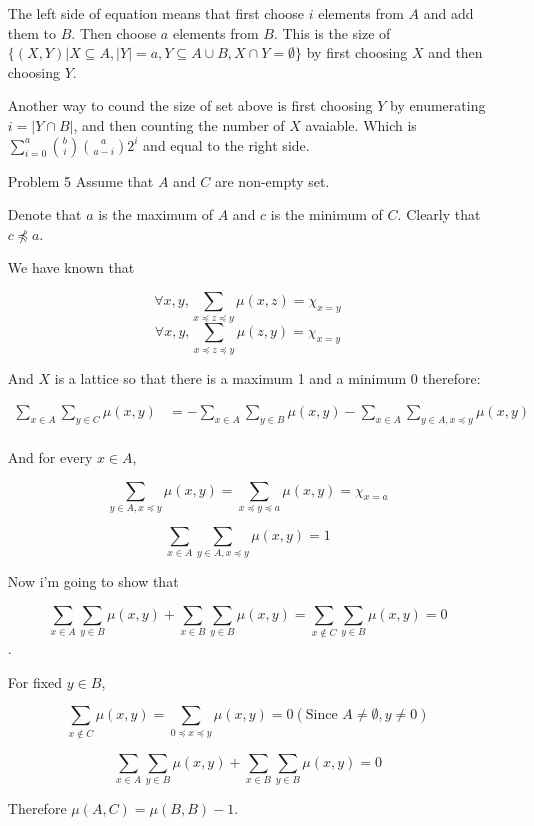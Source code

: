 \documentclass{article}
\begin{document}
\begin{itemize}
        The left side of equation means that first choose $i$ elements from $A$
        and add them to $B$. Then choose $a$ elements from $B$. This is the size
        of $\{(X, Y) | X \subseteq A, |Y| = a, Y \subseteq A \cup B, X \cap Y = \emptyset\}$
        by first choosing $X$ and then choosing $Y$.

        Another way to cound the size of set above is first choosing $Y$ by
        enumerating $i = |Y \cap B|$, and then counting the number of $X$ avaiable.
        Which is $\sum_{i=0}^{a}{b \choose i} {a \choose a-i} 2^i$ and equal to the right side.

    \item[Problem 5]
        Assume that $A$ and $C$ are non-empty set.

        Denote that $a$ is the maximum of $A$ and $c$ is the minimum
        of $C$. Clearly that $c \npreceq a$.

        We have known that 

        $$\forall x, y, \sum_{x \preceq z \preceq y} \mu(x, z) = \chi_{x=y}$$
        $$\forall x, y, \sum_{x \preceq z \preceq y} \mu(z, y) = \chi_{x=y}$$

        And $X$ is a lattice so that there is a maximum 1 and a minimum 0 therefore:

        \begin{align*}
            \sum_{x \in A} \sum_{y \in C} \mu(x, y) &= -\sum_{x \in A} \sum_{y \in B} \mu(x, y) - \sum_{x \in A} \sum_{y\in A, x \preceq y} \mu(x, y) \\
        \end{align*}

        And for every $x \in A$, 

        $$\sum_{y \in A, x \preceq y} \mu(x, y) = \sum_{x \preceq y \preceq a} \mu(x, y) = \chi_{x = a}$$

        $$\sum_{x \in A} \sum_{y\in A, x \preceq y} \mu(x, y) = 1$$

        Now i'm going to show that 
        
        $$\sum_{x \in A} \sum_{y \in B} \mu(x, y) + \sum_{x \in B} \sum_{y \in B} \mu(x, y)
        = \sum_{x \not\in C} \sum_{y \in B} \mu(x, y) = 0$$.

        For fixed $y \in B$, 
        
        $$\sum_{x \not\in C}\mu(x, y) = \sum_{0 \preceq x \preceq y}\mu(x, y) = 0 (\text{Since }A \neq \emptyset, y\neq 0)$$

        $$\sum_{x \in A} \sum_{y \in B} \mu(x, y) + \sum_{x \in B} \sum_{y \in B} \mu(x, y) = 0$$

        Therefore $\mu(A, C) = \mu(B, B) - 1$.

\end{itemize}
\end{document}
